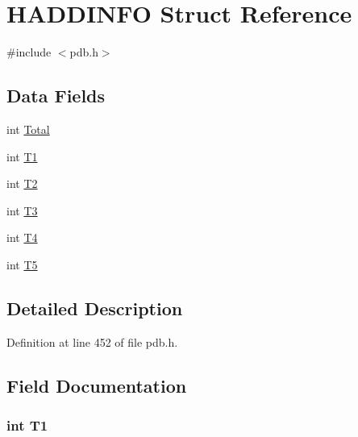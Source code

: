 \hypertarget{struct_h_a_d_d_i_n_f_o}{\section{H\-A\-D\-D\-I\-N\-F\-O Struct Reference}
\label{struct_h_a_d_d_i_n_f_o}
}


{\ttfamily \#include $<$pdb.\-h$>$}

\subsection*{Data Fields}
\begin{DoxyCompactItemize}
\item 
int \hyperlink{struct_h_a_d_d_i_n_f_o_ae36a1ad4b467c9b1268db3125492db4c}{Total}
\item 
int \hyperlink{struct_h_a_d_d_i_n_f_o_a5d1385ae89ef893054c6a52df3b1fe35}{T1}
\item 
int \hyperlink{struct_h_a_d_d_i_n_f_o_a185e71ed8316658125bb80cc43680c4b}{T2}
\item 
int \hyperlink{struct_h_a_d_d_i_n_f_o_a426934668477e96d234068290983eb56}{T3}
\item 
int \hyperlink{struct_h_a_d_d_i_n_f_o_afad4354178f725a1c2a72331a18df13f}{T4}
\item 
int \hyperlink{struct_h_a_d_d_i_n_f_o_a125e7d5d31e775dbaa703281275a6091}{T5}
\end{DoxyCompactItemize}


\subsection{Detailed Description}


Definition at line 452 of file pdb.\-h.



\subsection{Field Documentation}
\hypertarget{struct_h_a_d_d_i_n_f_o_a5d1385ae89ef893054c6a52df3b1fe35}{
\subsubsection[{T1}]{\setlength{\rightskip}{0pt plus 5cm}int T1}}\label{struct_h_a_d_d_i_n_f_o_a5d1385ae89ef893054c6a52df3b1fe35}


